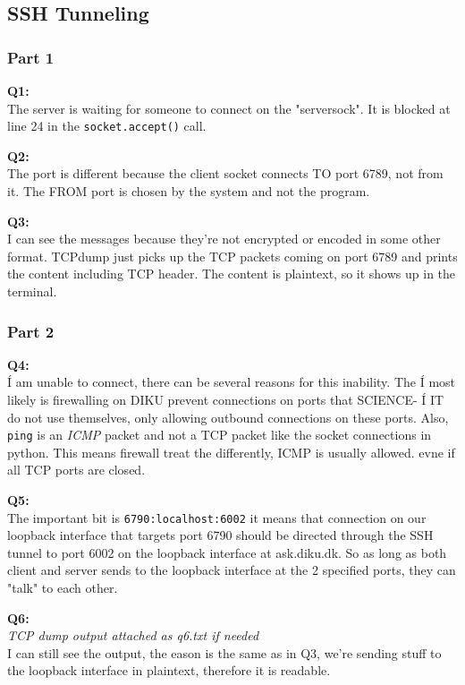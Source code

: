 \documentclass[10pt]{article}
\begin{document}
\subsection{SSH Tunneling}

\subsubsection{Part 1}
\noindent \textbf{Q1:}\\
The server is waiting for someone to connect on the "serversock". It is blocked
at line 24 in the \texttt{socket.accept()} call.

\noindent \textbf{Q2:}\\
The port is different because the client socket connects TO port 6789, not from
it. The FROM port is chosen by the system and not the program.

\noindent \textbf{Q3:}\\

I can see the messages because they're not encrypted or encoded in some other
format. TCPdump just picks up the TCP packets coming on port 6789 and prints the
content including TCP header. The content is plaintext, so it shows up in the
terminal.

\subsubsection{Part 2}

\noindent \textbf{Q4:}\\
Í am unable to connect, there can be several reasons for this inability. The Í
most likely is firewalling on DIKU prevent connections on ports that SCIENCE- Í
IT do not use themselves, only allowing outbound connections on these ports.
Also, \texttt{ping} is an \textit{ICMP} packet and not a TCP packet like the
socket connections in python. This means firewall treat the differently, ICMP is
usually allowed. evne if all TCP ports are closed.

\noindent \textbf{Q5:}\\

The important bit is \texttt{6790:localhost:6002} it means that connection on
our loopback interface that targets port 6790 should be directed through the SSH
tunnel to port 6002 on the loopback interface at ask.diku.dk. So as long as both
client and server sends to the loopback interface at the 2 specified ports, they
can "talk" to each other.

\noindent \textbf{Q6:}\\
\textit{TCP dump output attached as q6.txt if needed}\\
I can still see the output, the eason is the same as in Q3, we're sending stuff
to the loopback interface in plaintext, therefore it is readable.
\end{document}

